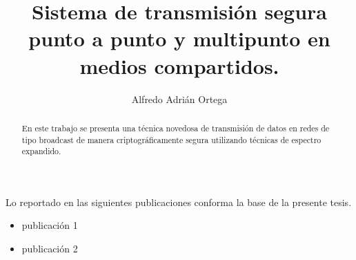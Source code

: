 \documentclass[12pt,twoside,openright]{moddalthesis}
\begin{document}
\title{\textbf{Sistema de transmisión segura punto a punto y multipunto en medios compartidos.}}
\author{Alfredo Adrián Ortega}
\address{Buenos Aires, Argentina}


{}








\nodedicationpage
\nolistoftables
\nolistoffigures


\beforepreface
 
\begin{abstract}
En este trabajo se presenta una técnica novedosa de transmisión de datos en redes de tipo broadcast de manera criptográficamente segura utilizando técnicas de espectro expandido.
\end{abstract}




\begin{listofpubs}
Lo reportado en las siguientes publicaciones conforma la base de la
presente tesis.

\begin{itemize}
\item publicación 1
\item publicación 2
\end{itemize}
\end{listofpubs}
\end{document}
